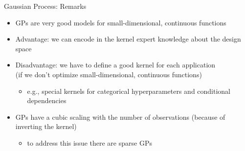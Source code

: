 \begin{frame}[c]{Gaussian Process: Remarks}

\begin{itemize}
	\item GPs are very good models for small-dimensional, continuous functions
	\item Advantage: we can encode in the kernel expert knowledge about the design space
	\pause
	\item Disadvantage: we have to define a good kernel for each application\\ (if we don't optimize small-dimensional, continuous functions) 
	\begin{itemize}
		 \item e.g., special kernels for categorical hyperparameters and conditional dependencies
	\end{itemize}
	\smallskip
	\pause
	\item GPs have a cubic scaling with the number of observations (because of inverting the kernel)
	\begin{itemize}
		\item to address this issue there are sparse GPs 
	\end{itemize}
\end{itemize}

\end{frame}
